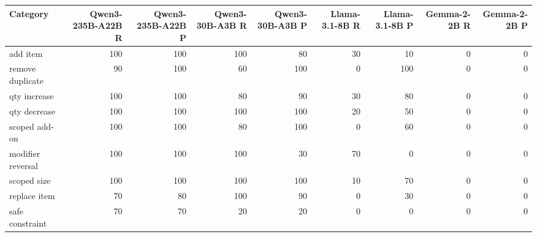 \begin{tabular}{lrrrrrrrr}
\toprule
Category & Qwen3-235B-A22B R & Qwen3-235B-A22B P & Qwen3-30B-A3B R & Qwen3-30B-A3B P & Llama-3.1-8B R & Llama-3.1-8B P & Gemma-2-2B R & Gemma-2-2B P \\
\midrule
add item & \cellcolor[gray]{0.65}100 & \cellcolor[gray]{0.65}100 & \cellcolor[gray]{0.65}100 & \cellcolor[gray]{0.72}80 & \cellcolor[gray]{0.90}30 & \cellcolor[gray]{0.96}10 & \cellcolor[gray]{1.00}0 & \cellcolor[gray]{1.00}0 \\
remove duplicate & \cellcolor[gray]{0.69}90 & \cellcolor[gray]{0.65}100 & \cellcolor[gray]{0.79}60 & \cellcolor[gray]{0.65}100 & \cellcolor[gray]{1.00}0 & \cellcolor[gray]{0.65}100 & \cellcolor[gray]{1.00}0 & \cellcolor[gray]{1.00}0 \\
qty increase & \cellcolor[gray]{0.65}100 & \cellcolor[gray]{0.65}100 & \cellcolor[gray]{0.72}80 & \cellcolor[gray]{0.69}90 & \cellcolor[gray]{0.90}30 & \cellcolor[gray]{0.72}80 & \cellcolor[gray]{1.00}0 & \cellcolor[gray]{1.00}0 \\
qty decrease & \cellcolor[gray]{0.65}100 & \cellcolor[gray]{0.65}100 & \cellcolor[gray]{0.65}100 & \cellcolor[gray]{0.65}100 & \cellcolor[gray]{0.93}20 & \cellcolor[gray]{0.82}50 & \cellcolor[gray]{1.00}0 & \cellcolor[gray]{1.00}0 \\
scoped add-on & \cellcolor[gray]{0.65}100 & \cellcolor[gray]{0.65}100 & \cellcolor[gray]{0.72}80 & \cellcolor[gray]{0.65}100 & \cellcolor[gray]{1.00}0 & \cellcolor[gray]{0.79}60 & \cellcolor[gray]{1.00}0 & \cellcolor[gray]{1.00}0 \\
modifier reversal & \cellcolor[gray]{0.65}100 & \cellcolor[gray]{0.65}100 & \cellcolor[gray]{0.65}100 & \cellcolor[gray]{0.90}30 & \cellcolor[gray]{0.76}70 & \cellcolor[gray]{1.00}0 & \cellcolor[gray]{1.00}0 & \cellcolor[gray]{1.00}0 \\
scoped size & \cellcolor[gray]{0.65}100 & \cellcolor[gray]{0.65}100 & \cellcolor[gray]{0.65}100 & \cellcolor[gray]{0.65}100 & \cellcolor[gray]{0.96}10 & \cellcolor[gray]{0.76}70 & \cellcolor[gray]{1.00}0 & \cellcolor[gray]{1.00}0 \\
replace item & \cellcolor[gray]{0.76}70 & \cellcolor[gray]{0.72}80 & \cellcolor[gray]{0.65}100 & \cellcolor[gray]{0.69}90 & \cellcolor[gray]{1.00}0 & \cellcolor[gray]{0.90}30 & \cellcolor[gray]{1.00}0 & \cellcolor[gray]{1.00}0 \\
safe constraint & \cellcolor[gray]{0.76}70 & \cellcolor[gray]{0.76}70 & \cellcolor[gray]{0.93}20 & \cellcolor[gray]{0.93}20 & \cellcolor[gray]{1.00}0 & \cellcolor[gray]{1.00}0 & \cellcolor[gray]{1.00}0 & \cellcolor[gray]{1.00}0 \\

\end{tabular}
